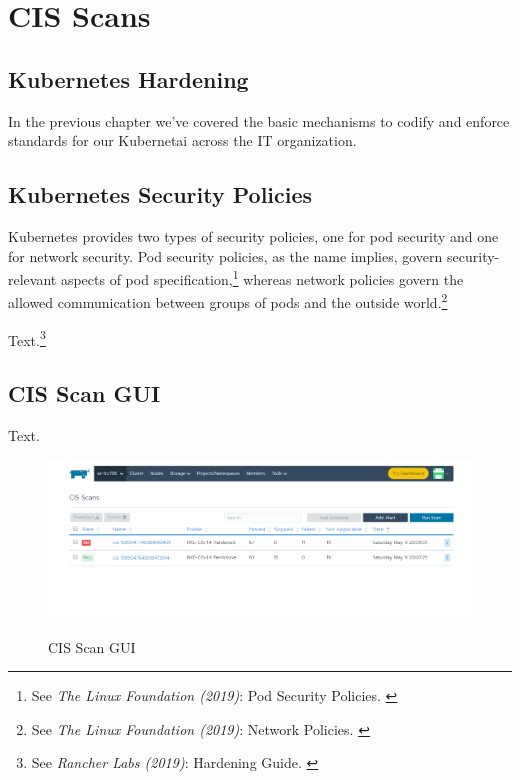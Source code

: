 %
%

\pagebreak
\section{CIS Scans}

\onehalfspacing

\subsection{Kubernetes Hardening}

In the previous chapter we've covered the basic mechanisms to codify and enforce standards for our Kubernetai across the IT organization.

\subsection{Kubernetes Security Policies}

Kubernetes provides two types of security policies, one for pod security and one for network security. Pod security policies, as the name implies, govern security-relevant aspects of pod specification,\footnote{See \textit{The Linux Foundation (2019)}: Pod Security Policies. \cite{podSecurity}} whereas network policies govern the allowed communication between groups of pods and the outside world.\footnote{See \textit{The Linux Foundation (2019)}: Network Policies. \cite{netSecurity}}

Text.\footnote{See \textit{Rancher Labs (2019)}: Hardening Guide. \cite{hardeningGuide}}

\subsection{CIS Scan GUI}

Text. 

\begin{figure}[H]
\centering
\caption {CIS Scan GUI}
\includegraphics[width=\linewidth]{images/cis-scan-overview.png}
\label{fig:cisScanOverview}
\end{figure}

